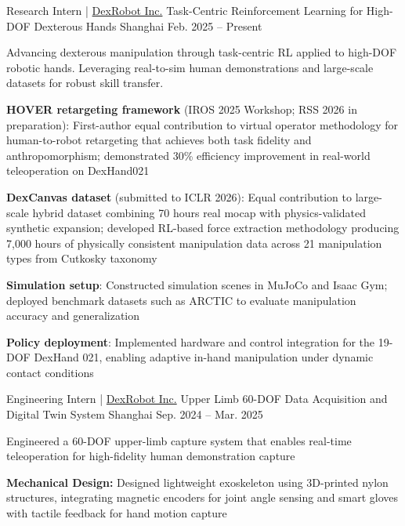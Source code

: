 
\vspace{-8mm}

\begin{cventries}
    \cventry
      {Research Intern | \href{https://dex-robot.com}{DexRobot Inc.}} %
      {Task-Centric Reinforcement Learning for High-DOF Dexterous Hands} %
      {Shanghai} %
      {Feb. 2025 -- Present} %
      {
        Advancing dexterous manipulation through task-centric RL applied to high-DOF robotic hands. Leveraging real-to-sim human demonstrations and large-scale datasets for robust skill transfer.
        \begin{cvitems}
          \item{\textbf{HOVER retargeting framework} (IROS 2025 Workshop; RSS 2026 in preparation): First-author equal contribution to virtual operator methodology for human-to-robot retargeting that achieves both task fidelity and anthropomorphism; demonstrated 30\% efficiency improvement in real-world teleoperation on DexHand021}
          \item{\textbf{DexCanvas dataset} (submitted to ICLR 2026): Equal contribution to large-scale hybrid dataset combining 70 hours real mocap with physics-validated synthetic expansion; developed RL-based force extraction methodology producing 7,000 hours of physically consistent manipulation data across 21 manipulation types from Cutkosky taxonomy}
          \item{\textbf{Simulation setup}: Constructed simulation scenes in MuJoCo and Isaac Gym; deployed benchmark datasets such as ARCTIC to evaluate manipulation accuracy and generalization}
          \item{\textbf{Policy deployment}: Implemented hardware and control integration for the 19-DOF DexHand 021, enabling adaptive in-hand manipulation under dynamic contact conditions}
        \end{cvitems}
      }
  \cventry
    {Engineering Intern | \href{https://dex-robot.com}{DexRobot Inc.}} %
    {Upper Limb 60-DOF Data Acquisition and Digital Twin System} %
    {Shanghai} %
    {Sep. 2024 -- Mar. 2025} %
    {
      Engineered a 60-DOF upper-limb capture system that enables real-time teleoperation for high-fidelity human demonstration capture
      \begin{cvitems}
        \item{\textbf{Mechanical Design:} Designed lightweight exoskeleton using 3D-printed nylon structures, integrating magnetic encoders for joint angle sensing and smart gloves with tactile feedback for hand motion capture}

\end{cvitems}}
\end{cventries}
